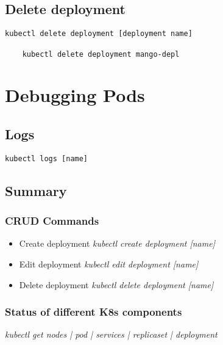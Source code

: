 \subsection{Delete deployment}\label{subsec:delete-deployment}
\begin{lstlisting}[label={lst:lstlisting15}]
    kubectl delete deployment [deployment name]

    kubectl delete deployment mango-depl
\end{lstlisting}

\section{Debugging Pods}\label{sec:debugging-pods}

\subsection{Logs}\label{subsec:logs}
\begin{lstlisting}[label={lst:lstlisting13}]
    kubectl logs [name]
\end{lstlisting}

\subsection{Summary}\label{subsec:summary}
\subsubsection{CRUD Commands}
\begin{itemize}
    \item Create deployment 
    \subitem \it{kubectl create deployment [name]}

    \item Edit deployment
    \subitem \it{kubectl edit deployment [name]}

    \item Delete deployment
    \subitem \it{kubectl delete deployment [name]}
\end{itemize}

\subsubsection{Status of different K8s components}
\it{kubectl get nodes | pod | services | replicaset | deployment}

